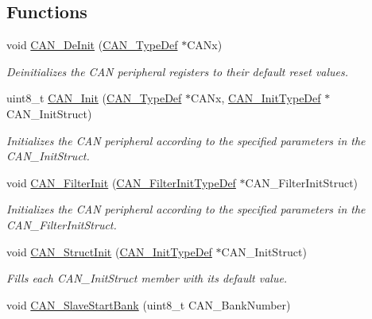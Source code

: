 \subsection*{Functions}
\begin{DoxyCompactItemize}
\item 
void \hyperlink{group___c_a_n___private___functions_ga002b74cd69574a14b17ad445090245cd}{C\+A\+N\+\_\+\+De\+Init} (\hyperlink{struct_c_a_n___type_def}{C\+A\+N\+\_\+\+Type\+Def} $\ast$C\+A\+Nx)
\begin{DoxyCompactList}\small\item\em Deinitializes the C\+AN peripheral registers to their default reset values. \end{DoxyCompactList}\item 
uint8\+\_\+t \hyperlink{group___c_a_n___private___functions_ga9023c35a9ab931ad4513fc5d19b4bd6c}{C\+A\+N\+\_\+\+Init} (\hyperlink{struct_c_a_n___type_def}{C\+A\+N\+\_\+\+Type\+Def} $\ast$C\+A\+Nx, \hyperlink{struct_c_a_n___init_type_def}{C\+A\+N\+\_\+\+Init\+Type\+Def} $\ast$C\+A\+N\+\_\+\+Init\+Struct)
\begin{DoxyCompactList}\small\item\em Initializes the C\+AN peripheral according to the specified parameters in the C\+A\+N\+\_\+\+Init\+Struct. \end{DoxyCompactList}\item 
void \hyperlink{group___c_a_n___private___functions_ga39476830280340363c51041be6b12647}{C\+A\+N\+\_\+\+Filter\+Init} (\hyperlink{struct_c_a_n___filter_init_type_def}{C\+A\+N\+\_\+\+Filter\+Init\+Type\+Def} $\ast$C\+A\+N\+\_\+\+Filter\+Init\+Struct)
\begin{DoxyCompactList}\small\item\em Initializes the C\+AN peripheral according to the specified parameters in the C\+A\+N\+\_\+\+Filter\+Init\+Struct. \end{DoxyCompactList}\item 
void \hyperlink{group___c_a_n___private___functions_gad77ad810868ed111755fc9e8ae0c7646}{C\+A\+N\+\_\+\+Struct\+Init} (\hyperlink{struct_c_a_n___init_type_def}{C\+A\+N\+\_\+\+Init\+Type\+Def} $\ast$C\+A\+N\+\_\+\+Init\+Struct)
\begin{DoxyCompactList}\small\item\em Fills each C\+A\+N\+\_\+\+Init\+Struct member with its default value. \end{DoxyCompactList}\item 
void \hyperlink{group___c_a_n___private___functions_ga109ff8960bc59f44b984c9646f17b3c0}{C\+A\+N\+\_\+\+Slave\+Start\+Bank} (uint8\+\_\+t C\+A\+N\+\_\+\+Bank\+Number)

\end{DoxyCompactItemize}
